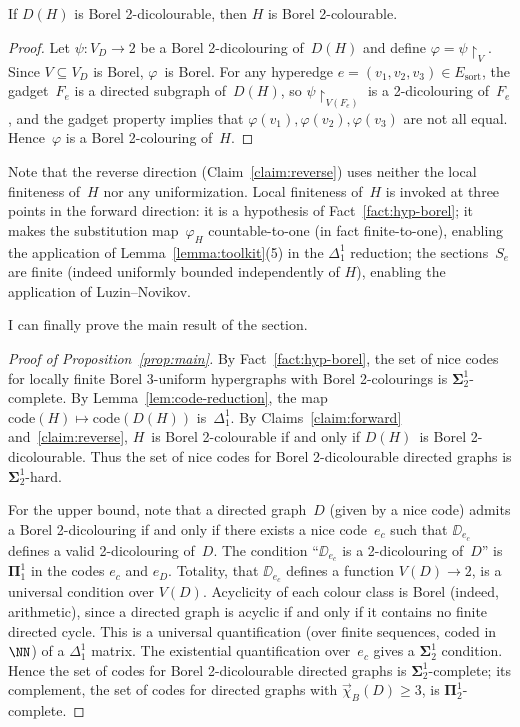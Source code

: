 \begin{claim}\label{claim:reverse}
	If $D(H)$ is Borel 2-dicolourable, then $H$ is Borel 2-colourable.
\end{claim}

\begin{proof}
	Let $\psi\colon V_D\to 2$ be a Borel 2-dicolouring of~$D(H)$ and define $\varphi = \psi\restriction_V$.
	Since $V\subseteq V_D$ is Borel, $\varphi$~is Borel.
	For any hyperedge $e=(v_1,v_2,v_3)\in E_{\mathrm{sort}}$, the gadget~$F_e$ is a directed subgraph of~$D(H)$, so $\psi\restriction_{V(F_e)}$ is a 2-dicolouring of~$F_e$, and the gadget property implies that $\varphi(v_1),\varphi(v_2),\varphi(v_3)$ are not all equal.
	Hence~$\varphi$ is a Borel 2-colouring of~$H$.
\end{proof}

\begin{remark}\label{rmk:no-lf-reverse}
	Note that the reverse direction (Claim~\ref{claim:reverse}) uses neither the local finiteness of~$H$ nor any uniformization.
	Local finiteness of~$H$ is invoked at three points in the forward direction: it is a hypothesis of Fact~\ref{fact:hyp-borel}; it makes the substitution map~$\varphi_H$ countable-to-one (in fact finite-to-one), enabling the application of Lemma~\ref{lemma:toolkit}(5) in the $\Delta^1_1$ reduction; the sections~$S_e$ are finite (indeed uniformly bounded independently of $H$), enabling the application of Luzin--Novikov.
\end{remark}

I can finally prove the main result of the section.

\begin{proof}[Proof of Proposition~\ref{prop:main}]
	By Fact~\ref{fact:hyp-borel}, the set of nice codes for locally finite Borel 3-uniform hypergraphs with Borel 2-colourings is $\mathbf\Sigma^1_2$-complete.
	By Lemma~\ref{lem:code-reduction}, the map $\mathrm{code}(H)\mapsto\mathrm{code}(D(H))$ is~$\Delta^1_1$.
	By Claims~\ref{claim:forward} and~\ref{claim:reverse}, $H$~is Borel 2-colourable if and only if $D(H)$~is Borel 2-dicolourable.
	Thus the set of nice codes for Borel 2-dicolourable directed graphs is $\mathbf\Sigma^1_2$-hard.

	For the upper bound, note that a directed graph~$D$ (given by a nice code) admits a Borel 2-dicolouring if and only if there exists a nice code~$e_c$ such that $\DD_{e_c}$ defines a valid 2-dicolouring of~$D$.
	The condition ``$\DD_{e_c}$ is a 2-dicolouring of~$D$'' is $\mathbf\Pi^1_1$ in the codes $e_c$ and $e_D$.
	Totality, that $\DD_{e_c}$ defines a function $V(D)\to 2$, is a universal condition over $V(D)$.
	Acyclicity of each colour class is Borel (indeed, arithmetic), since a directed graph is acyclic if and only if it contains no finite directed cycle.
	This is a universal quantification (over finite sequences, coded in~$\NN$) of a $\Delta^1_1$ matrix.
	The existential quantification over~$e_c$ gives a $\mathbf\Sigma^1_2$ condition.
	Hence the set of codes for Borel 2-dicolourable directed graphs is $\mathbf\Sigma^1_2$-complete; its complement, the set of codes for directed graphs with $\vec\chi_B(D)\geq 3$, is $\mathbf\Pi^1_2$-complete.
\end{proof}

